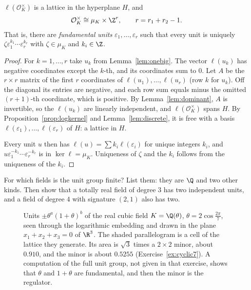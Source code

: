 \begin{theorem}\label{thm:dirichlet}
$\ell(\mathcal O_K^\times)$ is a lattice in the hyperplane $H$, and
\[
\mathcal O_K^\times\cong\mu_K\times\Z^{r},\qquad r=r_1+r_2-1.
\]
That is, there are \emph{fundamental units} $\varepsilon_1,\dots,\varepsilon_r$ such that every unit is uniquely
$\zeta\varepsilon_1^{k_1}\cdots\varepsilon_r^{k_r}$ with $\zeta\in\mu_K$ and $k_i\in\Z$.
\end{theorem}
\begin{proof}
For $k=1,\dots,r$ take $u_k$ from Lemma~\ref{lem:onebig}. The vector $\ell(u_k)$ has negative coordinates except the $k$-th,
and its coordinates sum to $0$. Let $A$ be the $r\times r$ matrix of the first $r$ coordinates of $\ell(u_1),\dots,
\ell(u_r)$ (row $k$ for $u_k$). Off the diagonal its entries are negative, and each row sum equals minus the omitted
$(r+1)$-th coordinate, which is positive. By Lemma~\ref{lem:dominant}, $A$ is invertible, so the $\ell(u_k)$ are linearly
independent, and $\ell(\mathcal O_K^\times)$ spans $H$. By Proposition~\ref{prop:logkernel} and Lemma~\ref{lem:discrete},
it is free with a basis $\ell(\varepsilon_1),\dots,\ell(\varepsilon_r)$ of $H$: a lattice in $H$.

Every unit $u$ then has $\ell(u)=\sum k_i\ell(\varepsilon_i)$ for unique integers $k_i$, and $u\varepsilon_1^{-k_1}\cdots
\varepsilon_r^{-k_r}$ is in $\ker\ell=\mu_K$. Uniqueness of $\zeta$ and the $k_i$ follows from the uniqueness of the $k_i$.
\end{proof}

\begin{think}
For which fields is the unit group finite? List them: they are $\Q$ and two other kinds. Then show that a totally real
field of degree $3$ has two independent units, and a field of degree $4$ with signature $(2,1)$ also has two.
\end{think}

\begin{figure}[ht]
\centering
{}
\caption{Units $\pm\theta^a(1+\theta)^b$ of the real cubic field $K=\Q(\theta)$, $\theta=2\cos\frac{2\pi}7$, seen through the logarithmic
embedding and drawn in the plane $x_1+x_2+x_3=0$ of $\R^3$. The shaded parallelogram is a cell of the lattice they generate. Its area is $\sqrt3$ times a $2\times2$ minor, about $0.910$, and the minor is about $0.5255$ (Exercise~\ref{ex:cyclic7}). A computation of the full unit group, not given in that exercise, shows that $\theta$ and $1+\theta$ are fundamental, and then the minor is the regulator.}
\label{fig:loglattice}
\end{figure}


